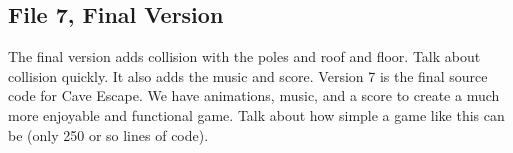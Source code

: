 \documentclass[12pt]{article}
\begin{document}
\newpage

\subsection*{File 7, Final Version}
The final version adds collision with the poles and roof and floor. Talk about collision quickly. It also adds the music and score.
Version 7 is the final source code for Cave Escape. We have animations, music, and a score to create a much more enjoyable and functional game.
Talk about how simple a game like this can be (only 250 or so lines of code).
\end{document}
